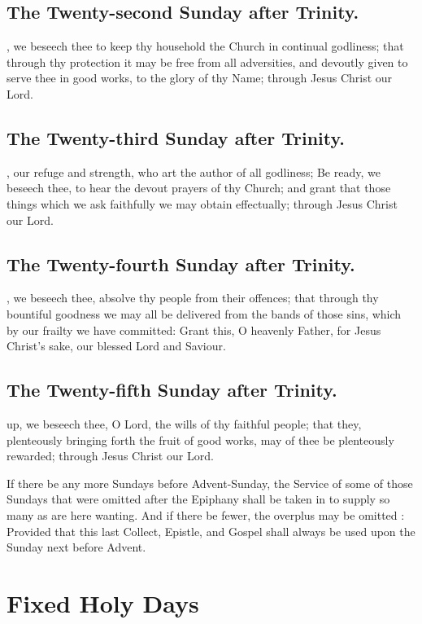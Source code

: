 \subsection{The Twenty-second Sunday after Trinity.}
, we beseech thee to keep thy household the Church in continual godliness; that through thy protection it may be free from all adversities, and devoutly given to serve thee in good works, to the glory of thy Name; through Jesus Christ our Lord.

\subsection{The Twenty-third Sunday after Trinity.}
, our refuge and strength, who art the author of all godliness; Be ready, we beseech thee, to hear the devout prayers of thy Church; and grant that those things which we ask faithfully we may obtain effectually; through Jesus Christ our Lord.

\subsection{The Twenty-fourth Sunday after Trinity.}
, we beseech thee, absolve thy people from their offences; that through thy bountiful goodness we may all be delivered from the bands of those sins, which by our frailty we have committed: Grant this, O heavenly Father, for Jesus Christ's sake, our blessed Lord and Saviour.

\subsection{The Twenty-fifth Sunday after Trinity.}
 up, we beseech thee, O Lord, the wills of thy faithful people; that they, plenteously bringing forth the fruit of good works, may of thee be plenteously rewarded; through Jesus Christ our Lord.

\begin{rubric}
If there be any more Sundays before Advent-Sunday, the Service of some of those Sundays that were omitted after the Epiphany shall be taken in to supply so many as are here wanting.
And if there be fewer, the overplus may be omitted : Provided that this last Collect, Epistle, and Gospel shall always be used upon the Sunday next before Advent.
\end{rubric}

\section{Fixed Holy Days}

